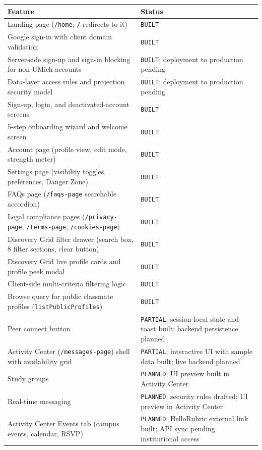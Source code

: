 \documentclass[11pt,letterpaper]{article}
\begin{document}
\begin{table}[h!]
\centering
\small
\begin{tabularx}{\textwidth}{l Y}
\toprule
\textbf{Feature} & \textbf{Status} \\
\midrule
Landing page (\texttt{/home}; \texttt{/} redirects to it) & \texttt{BUILT} \\
Google sign-in with client domain validation & \texttt{BUILT} \\
Server-side sign-up and sign-in blocking for non-UMich accounts & \texttt{BUILT}; deployment to production pending \\
Data-layer access rules and projection security model & \texttt{BUILT}; deployment to production pending \\
Sign-up, login, and deactivated-account screens & \texttt{BUILT} \\
5-step onboarding wizard and welcome screen & \texttt{BUILT} \\
Account page (profile view, edit mode, strength meter) & \texttt{BUILT} \\
Settings page (visibility toggles, preferences, Danger Zone) & \texttt{BUILT} \\
FAQs page (\texttt{/faqs-page} searchable accordion) & \texttt{BUILT} \\
Legal compliance pages (\texttt{/privacy-page}, \texttt{/terms-page}, \texttt{/cookies-page}) & \texttt{BUILT} \\
Discovery Grid filter drawer (search box, 8 filter sections, clear button) & \texttt{BUILT} \\
Discovery Grid live profile cards and profile peek modal & \texttt{BUILT} \\
Client-side multi-criteria filtering logic & \texttt{BUILT} \\
Browse query for public classmate profiles (\texttt{listPublicProfiles}) & \texttt{BUILT} \\
Peer connect button & \texttt{PARTIAL}; session-local state and toast built; backend persistence planned \\
Activity Center (\texttt{/messages-page}) shell with availability grid & \texttt{PARTIAL}; interactive UI with sample data built; live backend planned \\
Study groups & \texttt{PLANNED}; UI preview built in Activity Center \\
Real-time messaging & \texttt{PLANNED}; security rules drafted; UI preview in Activity Center \\
Activity Center Events tab (campus events, calendar, RSVP) & \texttt{PLANNED}; HelloRubric external link built; API sync pending institutional access \\

\end{tabularx}
\end{table}
\end{document}
